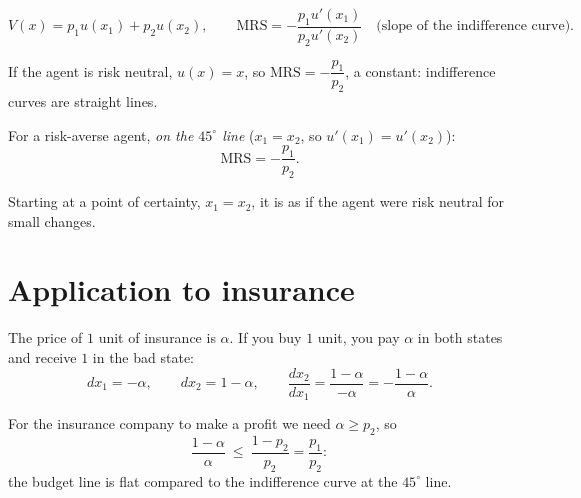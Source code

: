 \documentclass[11pt]{article}
\begin{document}
\begin{center}
\end{center}

\[ V(x)=p_1u(x_1)+p_2u(x_2), \qquad
   \mathrm{MRS}=-\frac{p_1u'(x_1)}{p_2u'(x_2)} \quad\text{(slope of the indifference curve).} \]

\begin{flatlist}
  \item If the agent is risk neutral, $u(x)=x$, so
        $\mathrm{MRS}=-\dfrac{p_1}{p_2}$, a constant: indifference curves are straight
        lines.
  \item For a risk-averse agent, \emph{on the $45^\circ$ line} ($x_1=x_2$, so
        $u'(x_1)=u'(x_2)$):
        \[ \mathrm{MRS}=-\frac{p_1}{p_2}. \]
\end{flatlist}
Starting at a point of certainty, $x_1=x_2$, it is as if the agent were risk neutral
for small changes.


\section{Application to insurance}

The price of $1$ unit of insurance is $\alpha$. If you buy $1$ unit, you pay $\alpha$ in
both states and receive $1$ in the bad state:
\[ dx_1=-\alpha, \qquad dx_2=1-\alpha, \qquad
   \frac{dx_2}{dx_1}=\frac{1-\alpha}{-\alpha}=-\frac{1-\alpha}{\alpha}. \]

For the insurance company to make a profit we need $\alpha\ge p_2$, so
\[ \frac{1-\alpha}{\alpha}\ \le\ \frac{1-p_2}{p_2}=\frac{p_1}{p_2}: \]
the budget line is flat compared to the indifference curve at the $45^\circ$ line.
\end{document}
